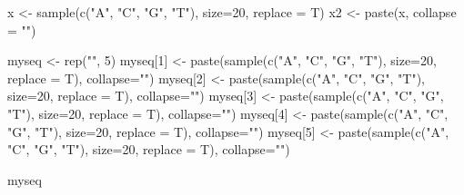 \documentclass[
]{book}
\newenvironment{Shaded}{\begin{snugshade}}{\end{snugshade}}
\newcommand{\AttributeTok}[1]{\textcolor[rgb]{0.77,0.63,0.00}{#1}}
\newcommand{\DecValTok}[1]{\textcolor[rgb]{0.00,0.00,0.81}{#1}}
\newcommand{\FunctionTok}[1]{\textcolor[rgb]{0.00,0.00,0.00}{#1}}
\newcommand{\NormalTok}[1]{#1}
\newcommand{\OtherTok}[1]{\textcolor[rgb]{0.56,0.35,0.01}{#1}}
\newcommand{\StringTok}[1]{\textcolor[rgb]{0.31,0.60,0.02}{#1}}
\begin{document}
\begin{Shaded}
\begin{Highlighting}[]

\NormalTok{x }\OtherTok{\textless{}{-}} \FunctionTok{sample}\NormalTok{(}\FunctionTok{c}\NormalTok{(}\StringTok{"A"}\NormalTok{, }\StringTok{"C"}\NormalTok{, }\StringTok{"G"}\NormalTok{, }\StringTok{"T"}\NormalTok{), }\AttributeTok{size=}\DecValTok{20}\NormalTok{, }\AttributeTok{replace =}\NormalTok{ T)}
\NormalTok{x2 }\OtherTok{\textless{}{-}} \FunctionTok{paste}\NormalTok{(x, }\AttributeTok{collapse =} \StringTok{""}\NormalTok{)}

\NormalTok{myseq }\OtherTok{\textless{}{-}} \FunctionTok{rep}\NormalTok{(}\StringTok{""}\NormalTok{, }\DecValTok{5}\NormalTok{)}
\NormalTok{myseq[}\DecValTok{1}\NormalTok{] }\OtherTok{\textless{}{-}} \FunctionTok{paste}\NormalTok{(}\FunctionTok{sample}\NormalTok{(}\FunctionTok{c}\NormalTok{(}\StringTok{"A"}\NormalTok{, }\StringTok{"C"}\NormalTok{, }\StringTok{"G"}\NormalTok{, }\StringTok{"T"}\NormalTok{), }\AttributeTok{size=}\DecValTok{20}\NormalTok{, }\AttributeTok{replace =}\NormalTok{ T), }\AttributeTok{collapse=}\StringTok{""}\NormalTok{)}
\NormalTok{myseq[}\DecValTok{2}\NormalTok{] }\OtherTok{\textless{}{-}} \FunctionTok{paste}\NormalTok{(}\FunctionTok{sample}\NormalTok{(}\FunctionTok{c}\NormalTok{(}\StringTok{"A"}\NormalTok{, }\StringTok{"C"}\NormalTok{, }\StringTok{"G"}\NormalTok{, }\StringTok{"T"}\NormalTok{), }\AttributeTok{size=}\DecValTok{20}\NormalTok{, }\AttributeTok{replace =}\NormalTok{ T), }\AttributeTok{collapse=}\StringTok{""}\NormalTok{)}
\NormalTok{myseq[}\DecValTok{3}\NormalTok{] }\OtherTok{\textless{}{-}} \FunctionTok{paste}\NormalTok{(}\FunctionTok{sample}\NormalTok{(}\FunctionTok{c}\NormalTok{(}\StringTok{"A"}\NormalTok{, }\StringTok{"C"}\NormalTok{, }\StringTok{"G"}\NormalTok{, }\StringTok{"T"}\NormalTok{), }\AttributeTok{size=}\DecValTok{20}\NormalTok{, }\AttributeTok{replace =}\NormalTok{ T), }\AttributeTok{collapse=}\StringTok{""}\NormalTok{)}
\NormalTok{myseq[}\DecValTok{4}\NormalTok{] }\OtherTok{\textless{}{-}} \FunctionTok{paste}\NormalTok{(}\FunctionTok{sample}\NormalTok{(}\FunctionTok{c}\NormalTok{(}\StringTok{"A"}\NormalTok{, }\StringTok{"C"}\NormalTok{, }\StringTok{"G"}\NormalTok{, }\StringTok{"T"}\NormalTok{), }\AttributeTok{size=}\DecValTok{20}\NormalTok{, }\AttributeTok{replace =}\NormalTok{ T), }\AttributeTok{collapse=}\StringTok{""}\NormalTok{)}
\NormalTok{myseq[}\DecValTok{5}\NormalTok{] }\OtherTok{\textless{}{-}} \FunctionTok{paste}\NormalTok{(}\FunctionTok{sample}\NormalTok{(}\FunctionTok{c}\NormalTok{(}\StringTok{"A"}\NormalTok{, }\StringTok{"C"}\NormalTok{, }\StringTok{"G"}\NormalTok{, }\StringTok{"T"}\NormalTok{), }\AttributeTok{size=}\DecValTok{20}\NormalTok{, }\AttributeTok{replace =}\NormalTok{ T), }\AttributeTok{collapse=}\StringTok{""}\NormalTok{)}

\NormalTok{myseq}
\end{Highlighting}
\end{Shaded}
\end{document}
